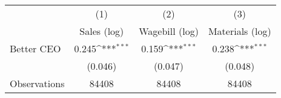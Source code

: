 {
\def\sym#1{\ifmmode^{#1}\else\(^{#1}\)\fi}
\begin{tabular}{l*{3}{c}}
\hline\hline
                    &\multicolumn{1}{c}{(1)}&\multicolumn{1}{c}{(2)}&\multicolumn{1}{c}{(3)}\\
                    &\multicolumn{1}{c}{Sales (log)}&\multicolumn{1}{c}{Wagebill (log)}&\multicolumn{1}{c}{Materials (log)}\\
\hline
Better CEO          &       0.245\sym{***}&       0.159\sym{***}&       0.238\sym{***}\\
                    &     (0.046)         &     (0.047)         &     (0.048)         \\
\hline
Observations        &       84408         &       84408         &       84408         \\
\hline\hline
\end{tabular}
}
